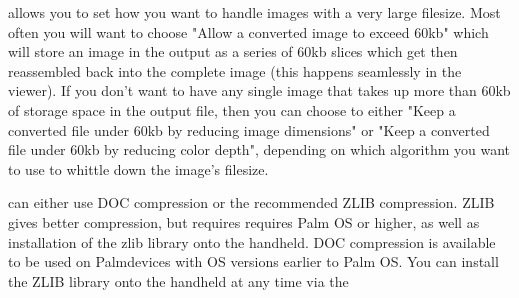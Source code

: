 allows you to set how you want to handle images with a very large filesize.
Most often you will want to choose "Allow a converted image to exceed 60kb"
which will store an image in the output as a series of 60kb slices which 
get then reassembled back into the complete image 
(this happens seamlessly in the viewer).
If you don't want to have any single image that takes up more than 60kb of
storage space in the output file, then you can choose to either 
"Keep a converted file under 60kb by reducing image dimensions" or 
"Keep a converted file under 60kb by reducing color depth", depending on 
which algorithm you want to use to whittle down the image's filesize.





 can either use DOC compression or
the recommended ZLIB compression. ZLIB gives better compression, but requires
requires Palm OS or higher, as well as installation of the zlib
library onto the handheld. DOC compression is available to be used on
Palm\registered devices with OS versions earlier to Palm OS. You
can install the ZLIB library onto the handheld at any time via the
\helpignore{\ref{sec:pd-install-wizard}}

